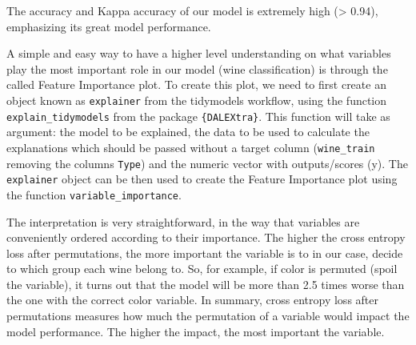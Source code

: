 \documentclass[
]{krantz}
\makeatletter
\newenvironment{Shaded}{\begin{snugshade}}{\end{snugshade}}
\newcommand{\AttributeTok}[1]{\textcolor[rgb]{0.61,0.61,0.61}{#1}}
\newcommand{\FunctionTok}[1]{\textcolor[rgb]{0,0,0}{#1}}
\newcommand{\NormalTok}[1]{#1}
\newcommand{\OtherTok}[1]{\textcolor[rgb]{0.37,0.37,0.37}{#1}}
\newcommand{\SpecialCharTok}[1]{\textcolor[rgb]{0,0,0}{#1}}
\newcommand{\StringTok}[1]{\textcolor[rgb]{0.5,0.5,0.5}{#1}}
\newenvironment{kframe}{%
\medskip{}
\setlength{\fboxsep}{.8em}
 \def\at@end@of@kframe{}%
 \ifinner\ifhmode%
  \def\at@end@of@kframe{\end{minipage}}%
  \begin{minipage}{\columnwidth}%
 \fi\fi%
 \def\FrameCommand##1{\hskip\@totalleftmargin \hskip-\fboxsep
 \colorbox{shadecolor}{##1}\hskip-\fboxsep
     \hskip-\linewidth \hskip-\@totalleftmargin \hskip\columnwidth}%
 \MakeFramed {\advance\hsize-\width
   \@totalleftmargin\z@ \linewidth\hsize
   \@setminipage}}%
 {\par\unskip\endMakeFramed%
 \at@end@of@kframe}
\renewenvironment{Shaded}{\begin{kframe}}{\end{kframe}}
\makeatother
\begin{document}
The accuracy and Kappa accuracy of our model is extremely high (\textgreater{} 0.94), emphasizing its great model performance.

A simple and easy way to have a higher level understanding on what variables play the most important role in our model (wine classification) is through the called Feature Importance plot. To create this plot, we need to first create an object known as \texttt{explainer} from the tidymodels workflow, using the function \texttt{explain\_tidymodels} from the package \texttt{\{DALEXtra\}}. This function will take as argument: the model to be explained, the data to be used to calculate the explanations which should be passed without a target column (\texttt{wine\_train} removing the columns \texttt{Type}) and the numeric vector with outputs/scores (y). The \texttt{explainer} object can be then used to create the Feature Importance plot using the function \texttt{variable\_importance}.

The interpretation is very straightforward, in the way that variables are conveniently ordered according to their importance. The higher the cross entropy loss after permutations, the more important the variable is to in our case, decide to which group each wine belong to. So, for example, if color is permuted (spoil the variable), it turns out that the model will be more than 2.5 times worse than the one with the correct color variable. In summary, cross entropy loss after permutations measures how much the permutation of a variable would impact the model performance. The higher the impact, the most important the variable.

\begin{Shaded}
\end{Shaded}
\end{document}
